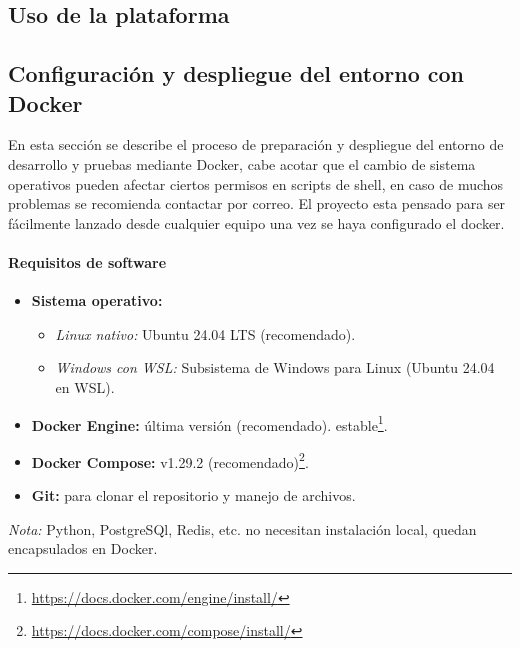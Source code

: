 \documentclass[12pt, a4paper]{article}
\begin{document}
\begin{umaappendices}
	
	\subsection{Uso de la plataforma}
	
	\subsection{Configuración y despliegue del entorno con Docker}
	\label{sec:deploy_docker}
	
	En esta sección se describe el proceso de preparación y despliegue del entorno de desarrollo y pruebas mediante Docker, cabe acotar que el cambio de sistema operativos pueden afectar ciertos permisos en scripts de shell, en caso de muchos problemas se recomienda contactar por correo. El proyecto esta pensado para ser fácilmente lanzado desde cualquier equipo una vez se haya configurado el docker.
	
	\paragraph{Requisitos de software}
	\begin{itemize}
		\item \textbf{Sistema operativo:}
		\begin{itemize}
			\item \emph{Linux nativo:} Ubuntu 24.04 LTS (recomendado).  
			\item \emph{Windows con WSL:} Subsistema de Windows para Linux (Ubuntu 24.04 en WSL).  
		\end{itemize}
		\item \textbf{Docker Engine:} última versión (recomendado). estable\footnote{\url{https://docs.docker.com/engine/install/}}.  
		\item \textbf{Docker Compose:} v1.29.2 (recomendado)\footnote{\url{https://docs.docker.com/compose/install/}}.  
		\item \textbf{Git:} para clonar el repositorio y manejo de archivos.  
	\end{itemize}
	\emph{Nota:} Python, PostgreSQl, Redis, etc. no necesitan instalación local, quedan encapsulados en Docker.
	

\end{umaappendices}
\end{document}
